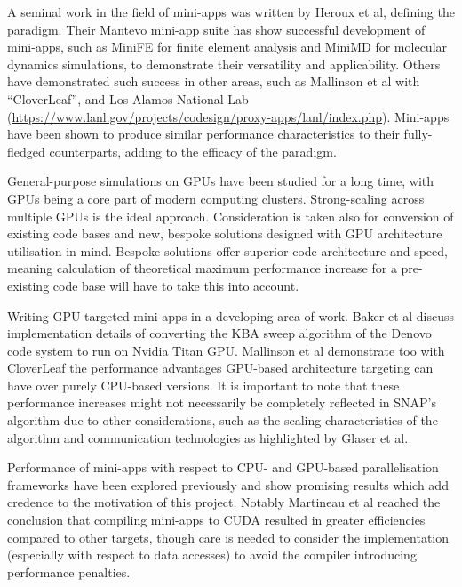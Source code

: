 \documentclass[conference]{IEEEtran}
\begin{document}
A seminal work in the field of mini-apps was written by Heroux et al\cite{miniapps}, defining the paradigm. Their Mantevo mini-app suite has show successful development of mini-apps, such as MiniFE for finite element analysis and MiniMD for molecular dynamics simulations, to demonstrate their versatility and applicability. Others have demonstrated such success in other areas, such as Mallinson et al with ``CloverLeaf”\cite{mallinson2013cloverleaf}, and Los Alamos National Lab (\url{https://www.lanl.gov/projects/codesign/proxy-apps/lanl/index.php}). Mini-apps have been shown to produce similar performance characteristics to their fully-fledged counterparts\cite{miniapps}, adding to the efficacy of the paradigm.

General-purpose simulations on GPUs have been studied for a long time, with GPUs being a core part of modern computing clusters\cite{debardeleben2013gpu}. Strong-scaling across multiple GPUs\cite{glaser2015strong} is the ideal approach. Consideration is taken also for conversion of existing code bases\cite{zhou2011gpu} and new, bespoke solutions designed with GPU architecture utilisation in mind\cite{glaser2015strong}. Bespoke solutions offer superior code architecture and speed, meaning calculation of theoretical maximum performance increase for a pre-existing code base will have to take this into account.

Writing GPU targeted mini-apps in a developing area of work. Baker et al\cite{baker2012high} discuss implementation details of converting the KBA sweep algorithm of the Denovo code system to run on Nvidia Titan GPU. Mallinson et al\cite{mallinson2013cloverleaf} demonstrate too with CloverLeaf the performance advantages GPU-based architecture targeting can have over purely CPU-based versions. It is important to note that these performance increases might not necessarily be completely reflected in SNAP’s algorithm due to other considerations, such as the scaling characteristics of the algorithm\cite{shoukourian2014predicting} and communication technologies as highlighted by Glaser et al\cite{glaser2015strong}.

Performance of mini-apps with respect to CPU- and GPU-based parallelisation frameworks have been explored previously and show promising results which add credence to the motivation of this project. Notably Martineau et al\cite{martineau2017productivity} reached the conclusion that compiling mini-apps to CUDA resulted in greater efficiencies compared to other targets, though care is needed to consider the implementation (especially with respect to data accesses) to avoid the compiler introducing performance penalties.
\end{document}
